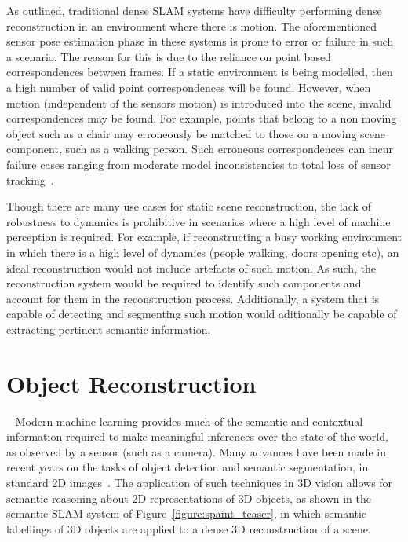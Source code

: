 As outlined, traditional dense SLAM systems have difficulty performing dense reconstruction in an 
environment where there is motion. The aforementioned sensor pose estimation phase in these systems
is prone to error or failure in such a scenario. The reason for this is due to the reliance on point based 
correspondences between frames. If a static environment is being modelled, then a high number of valid point 
correspondences will be found. However, when motion (independent of the sensors motion) is introduced into 
the scene, invalid correspondences may be found. For example, points that belong to a non moving object 
such as a chair may erroneously be matched to those on a moving scene component, such as a walking person.
Such erroneous correspondences can incur failure cases ranging from moderate model inconsistencies to total 
loss of sensor tracking~\cite{Newcombe2015}.

Though there are many use cases for static scene reconstruction, the lack of robustness to dynamics is 
prohibitive in scenarios where a high level of machine perception is required. For example, if 
reconstructing a busy working environment in which there is a high level of dynamics (people walking, 
doors opening etc), an ideal reconstruction would not include artefacts of such motion. As such, the 
reconstruction system would be required to identify such components and account for them in the 
reconstruction process. Additionally, a system that is capable of detecting and segmenting such motion 
would  aditionally be capable of extracting pertinent semantic information.

\section{Object Reconstruction}
~\label{sec:intro_object_recon}
Modern machine learning provides much of the semantic and contextual information required to make meaningful 
inferences over the state of the world, as observed by a sensor (such as a camera). Many advances 
have been made in recent years on the tasks of object detection and semantic segmentation, in standard 2D 
images~\cite{Girshick2014,Shelhamer2017,Civera2011}. The application of such techniques in 3D vision allows 
for semantic reasoning about 2D representations of 3D objects, as shown in the semantic SLAM system of 
Figure~\ref{figure:spaint_teaser}, in which semantic labellings of 3D objects are applied to a 
dense 3D reconstruction of a scene.

